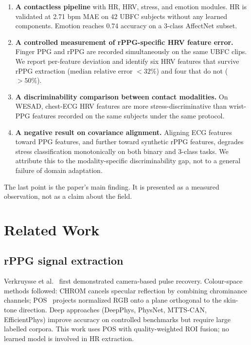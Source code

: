 \documentclass[conference]{IEEEtran}
\begin{document}
\begin{enumerate}
\item \textbf{A contactless pipeline} with HR, HRV, stress, and emotion
modules. HR is validated at 2.71 bpm MAE on 42 UBFC subjects without
any learned components. Emotion reaches 0.74 accuracy on a 3-class
AffectNet subset.

\item \textbf{A controlled measurement of rPPG-specific HRV feature
error.} Finger PPG and rPPG are recorded simultaneously on the same
UBFC clips. We report per-feature deviation and identify six HRV
features that survive rPPG extraction (median relative error
$<32\%$) and four that do not ($>50\%$).

\item \textbf{A discriminability comparison between contact
modalities.} On WESAD, chest-ECG HRV features are more
stress-discriminative than wrist-PPG features recorded on the same
subjects under the same protocol.

\item \textbf{A negative result on covariance alignment.} Aligning
ECG features toward PPG features, and further toward synthetic rPPG
features, degrades stress classification monotonically on both binary
and 3-class tasks. We attribute this to the modality-specific
discriminability gap, not to a general failure of domain adaptation.
\end{enumerate}

The last point is the paper's main finding. It is presented as a
measured observation, not as a claim about the field.

\section{Related Work}

\subsection{rPPG signal extraction}
Verkruysse et al.~\cite{verkruysse2008} first demonstrated
camera-based pulse recovery. Colour-space methods followed: CHROM
\cite{dehaan2013} cancels specular reflection by combining
chrominance channels; POS~\cite{wang2017} projects normalized RGB onto
a plane orthogonal to the skin-tone direction. Deep approaches
(DeepPhys, PhysNet, MTTS-CAN, EfficientPhys) improve accuracy on
controlled benchmarks but require large labelled corpora. This work
uses POS with quality-weighted ROI fusion; no learned model is
involved in HR extraction.
\end{document}
